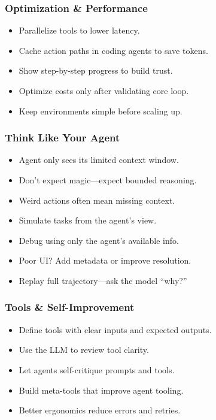 \begin{frame}[fragile]\frametitle{Optimization \& Performance}
    \begin{itemize}
        \item Parallelize tools to lower latency.
        \item Cache action paths in coding agents to save tokens.
        \item Show step-by-step progress to build trust.
        \item Optimize costs only after validating core loop.
        \item Keep environments simple before scaling up.
    \end{itemize}
\end{frame}

\begin{frame}[fragile]\frametitle{Think Like Your Agent}
    \begin{itemize}
        \item Agent only sees its limited context window.
        \item Don’t expect magic—expect bounded reasoning.
        \item Weird actions often mean missing context.
        \item Simulate tasks from the agent’s view.
        \item Debug using only the agent’s available info.
        \item Poor UI? Add metadata or improve resolution.
        \item Replay full trajectory—ask the model “why?”
    \end{itemize}
\end{frame}

\begin{frame}[fragile]\frametitle{Tools \& Self-Improvement}
    \begin{itemize}
        \item Define tools with clear inputs and expected outputs.
        \item Use the LLM to review tool clarity.
        \item Let agents self-critique prompts and tools.
        \item Build meta-tools that improve agent tooling.
        \item Better ergonomics reduce errors and retries.
    \end{itemize}
\end{frame}

